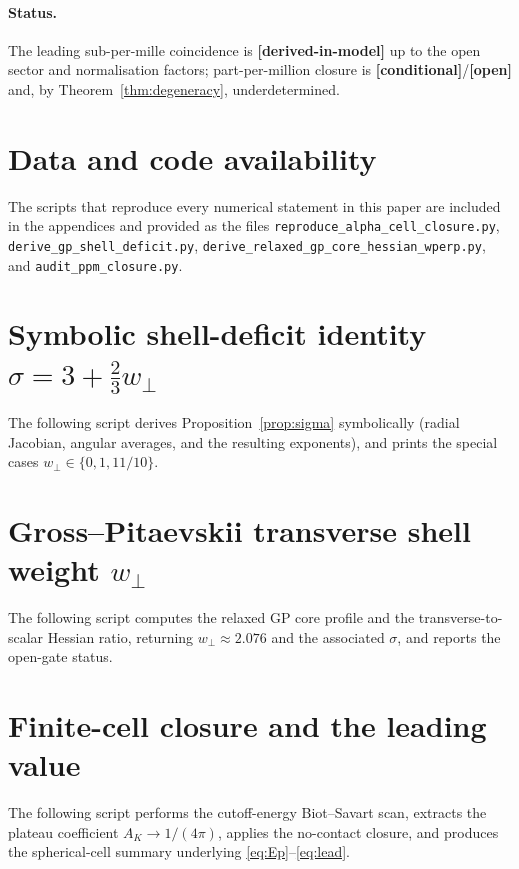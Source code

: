 \documentclass[11pt,a4paper]{article}
\theoremstyle{definition}
\newcommand{\derivedmodel}{\textbf{[derived-in-model]}}
\newcommand{\conditional}{\textbf{[conditional]}}
\newcommand{\open}{\textbf{[open]}}
\begin{document}
\paragraph{Status.} The leading sub-per-mille coincidence is \derivedmodel{} up to
the open sector and normalisation factors; part-per-million closure is
\conditional{}/\open{} and, by Theorem~\ref{thm:degeneracy}, underdetermined.

\section*{Data and code availability}
The scripts that reproduce every numerical statement in this paper are included in
the appendices and provided as the files \texttt{reproduce\_alpha\_cell\_closure.py},
\texttt{derive\_gp\_shell\_deficit.py},
\texttt{derive\_relaxed\_gp\_core\_hessian\_wperp.py}, and
\texttt{audit\_ppm\_closure.py}.

\appendix
\section{Symbolic shell-deficit identity \texorpdfstring{$\sigma=3+\tfrac23 w_\perp$}{sigma}}
\label{app:shell}
The following script derives Proposition~\ref{prop:sigma} symbolically (radial
Jacobian, angular averages, and the resulting exponents), and prints the special
cases $w_\perp\in\{0,1,11/10\}$.


\section{Gross--Pitaevskii transverse shell weight \texorpdfstring{$w_\perp$}{wperp}}
\label{app:wperp}
The following script computes the relaxed GP core profile and the
transverse-to-scalar Hessian ratio, returning $w_\perp\approx2.076$ and the
associated $\sigma$, and reports the open-gate status.


\section{Finite-cell closure and the leading value}
\label{app:closure}
The following script performs the cutoff-energy Biot--Savart scan, extracts the
plateau coefficient $A_K\to1/(4\pi)$, applies the no-contact closure, and produces
the spherical-cell summary underlying \eqref{eq:Ep}--\eqref{eq:lead}.

\end{document}
